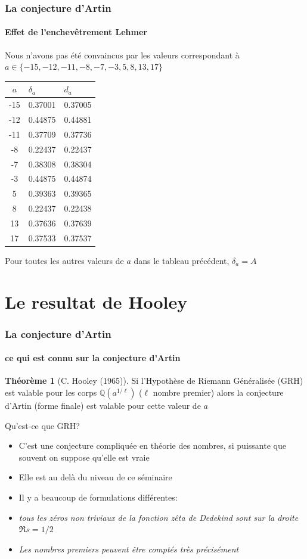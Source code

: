\documentclass[10pt,handout]{beamer} %
\newcommand{\Q}{\mathbb Q}
\theoremstyle{definition}
\newtheorem{theoreme}[theorem]{{Th\'eor\`eme}}
\begin{document}
\begin{frame}
\frametitle{La conjecture d'Artin}
\framesubtitle{Effet de l'enchev\^etrement Lehmer}

Nous n'avons pas \'et\'e convaincus par les valeurs correspondant \`a $a\in\{-15, -12, -11, -8, -7, -3, 5, 8, 13, 17\}$\pause

\begin{center}
\begin{tabular}{|c|l|l|}
\hline
$a$ & $\delta_a$ & $d_a$ \\
\hline
-15&0.37001 &0.37005\\
-12&0.44875 &0.44881 \\
-11&0.37709 &0.37736\\
-8 &0.22437 &0.22437\\
-7 &0.38308 &0.38304\\
-3 &0.44875 &0.44874\\
 5&0.39363 & 0.39365 \\
 8&0.22437 & 0.22438 \\
13 &0.37636& 0.37639 \\
17 &0.37533& 0.37537 \\
\hline
\end{tabular}\end{center}\pause

Pour toutes les autres valeurs de $a$ dans le tableau pr\'ec\'edent, $\delta_a=A$
\end{frame}

\section{Le resultat de Hooley}

\begin{frame}\frametitle{La conjecture d'Artin}
\framesubtitle{ce qui est connu sur la conjecture d'Artin}

\begin{theoreme}[C. Hooley (1965)] Si 
l'Hypoth\`ese de Riemann G\'en\'eralis\'ee (GRH) est valable pour les corps
 $\Q(a^{1/\ell})$ ($\ell$ nombre premier) 
alors la conjecture d'Artin (forme finale) est valable pour cette valeur de $a$
\end{theoreme}\pause

Qu'est-ce que GRH?\pause

\begin{itemize}[<+-|alert@+>]
\item C'est une conjecture compliqu\'ee en th\'eorie des nombres, si puissante
que souvent on suppose qu'elle est vraie
\item Elle est au del\`a du niveau de ce s\'eminaire
\item Il y a beaucoup de formulations diff\'erentes:
\item \emph{tous les z\'eros non triviaux de la fonction z\^eta de Dedekind sont 
sur la droite $\Re s=1/2$}
\item \emph{Les nombres premiers peuvent \^etre compt\'es tr\`es pr\'ecis\'ement}
\end{itemize}
\end{frame}
\end{document}
